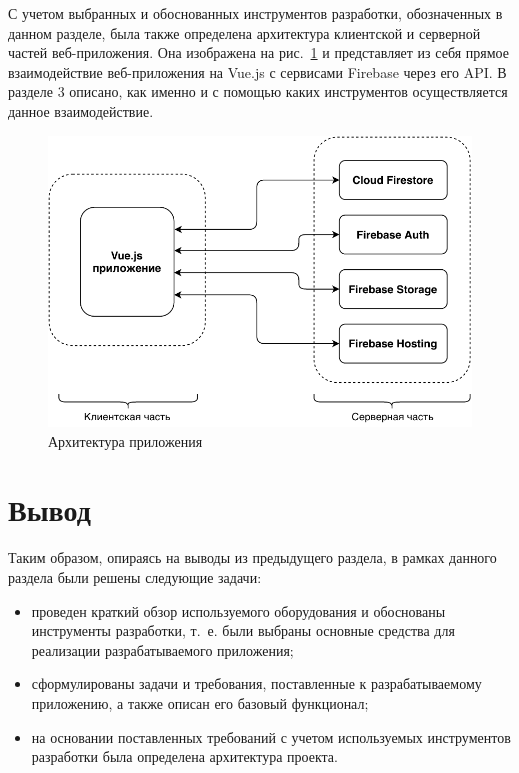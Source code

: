 С учетом выбранных и обоснованных инструментов разработки, обозначенных в данном разделе, была также определена архитектура клиентской и серверной частей веб-приложения. Она изображена на рис.~\ref{fig:arch} и представляет из себя прямое взаимодействие веб-приложения на Vue.js с сервисами Firebase через его API. В разделе 3 описано, как именно и с помощью каких инструментов осуществляется данное взаимодействие.

\clearpage

\begin{figure}[h]
	\centering
	\includegraphics[width=\textwidth, keepaspectratio]{figures/arch}
	\caption{Архитектура приложения}
	\label{fig:arch}
\end{figure}

\section{Вывод}

Таким образом, опираясь на выводы из предыдущего раздела, в рамках данного раздела были решены следующие задачи:

\begin{itemize}
	\item проведен краткий обзор используемого оборудования и обоснованы инструменты разработки, т.~е. были выбраны основные средства для реализации разрабатываемого приложения;
	\item сформулированы задачи и требования, поставленные к разрабатываемому приложению, а также описан его базовый функционал;
	\item на основании поставленных требований с учетом используемых инструментов разработки была определена архитектура проекта.
\end{itemize}

